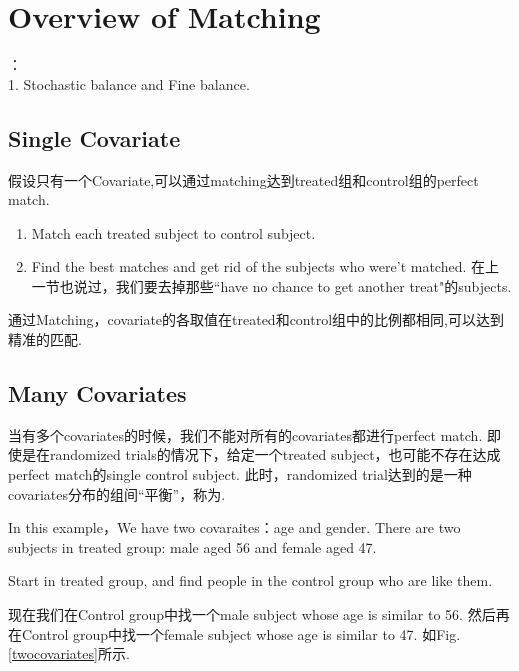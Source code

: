 \section{Overview of Matching}
：\\
1. Stochastic balance and Fine balance.

\subsection{Single Covariate}
假设只有一个Covariate,可以通过matching达到treated组和control组的perfect match.
\begin{enumerate}[label=(\arabic*)]
	\item Match each treated subject to control subject.
	
	\item Find the best matches and get rid of the subjects who were't matched. 在上一节也说过，我们要去掉那些“have no chance to get another treat"的subjects.
\end{enumerate}

通过Matching，covariate的各取值在treated和control组中的比例都相同,可以达到精准的匹配.

\subsection{Many Covariates}
当有多个covariates的时候，我们不能对所有的covariates都进行perfect match. 即使是在randomized trials的情况下，给定一个treated subject，也可能不存在达成perfect match的single control subject.
此时，randomized trial达到的是一种covariates分布的组间“平衡”，称为{\color{red}{“Stochastic balance”}}.

\begin{ex}
In this example，We have two covaraites：age and gender. There are two subjects in treated group: male aged 56 and female aged 47. \\
\begin{note}
	{\color{orange} \quad Start in treated group, and find people in the control group who are like them.} 
\end{note} 
现在我们在Control group中找一个male subject whose age is similar to 56. 然后再在Control group中找一个female subject whose age is similar to 47. 如Fig.\ref{twocovariates}所示.
\end{ex}

